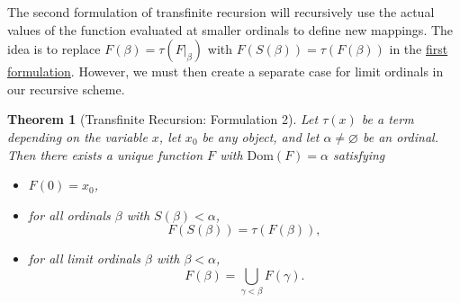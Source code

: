 \documentclass[a4paper,11pt]{article}
\theoremstyle{plain}
\newtheorem{thm}{Theorem}[subsection]
\theoremstyle{definition}
\theoremstyle{remark}
\begin{document}
The second formulation of transfinite recursion will recursively use the actual values of the function evaluated at smaller ordinals to define new mappings. The idea is to replace $F(\beta) = \tau(F|_\beta)$ with $F(S(\beta)) = \tau(F(\beta))$ in the \hyperref[thm:Trecursion1]{first formulation}. However, we must then create a separate case for limit ordinals in our recursive scheme.

\begin{thm}[Transfinite Recursion: Formulation 2]
\label{thm:Trecursion2}
Let $\tau(x)$ be a term depending on the variable $x$, let $x_0$ be any object, and let $\alpha \neq \varnothing$ be an ordinal. Then there exists a unique function $F$ with $\mathrm{Dom}(F) = \alpha$ satisfying
\begin{itemize}
\item $F(0) = x_0$,
\item for all ordinals $\beta$ with $S(\beta) < \alpha$,
\[F(S(\beta)) = \tau(F(\beta)),\]
\item for all limit ordinals $\beta$ with $\beta<\alpha$, 
\[F(\beta) = \bigcup_{\gamma<\beta} F(\gamma).\]
\end{itemize}
\end{thm}
\end{document}
